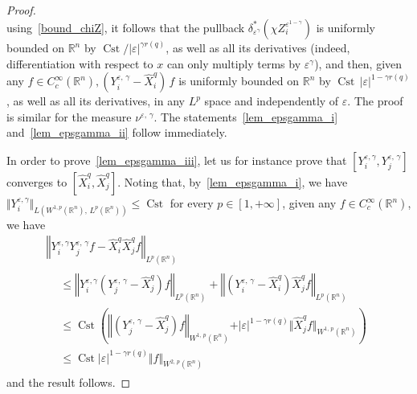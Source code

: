 \documentclass[10pt]{amsart}
\theoremstyle{definition}\newtheorem{defi}[theo]{Definition}\newtheorem{rema}[theo]{Remark}\newtheorem{exam}[theo]{Example}\newtheorem{exem}[theo]{Example}\newtheorem{nota}[theo]{Notation}
\newcommand*\R{\mathbb{R}}
\DeclareMathOperator{\Cst}{Cst}
\renewcommand{\leq}{\leqslant}
\begin{document}
\begin{proof}
\[\]
using~\eqref{bound_chiZ}, it follows that the pullback $\delta_{\varepsilon^\gamma}^* (\chi Z_i^{\varepsilon^{1-\gamma}} )$ is uniformly bounded on $\R^n$ by $\Cst/\vert\varepsilon\vert^{\gamma r(q)}$, as well as all its derivatives (indeed, differentiation with respect to $x$ can only multiply terms by $\varepsilon^\gamma$), and then, given any
$
f\in C_c^\infty(\R^n), (Y_i^{\varepsilon,\,\gamma}-\widehat{X}_i^{q})\,f
$
 is uniformly bounded on $\R^n$ by $\Cst\,\vert\varepsilon\vert^{1-\gamma r(q)}$, as well as all its derivatives, in any $L^p$ space and independently of $\varepsilon$. The proof is similar for the measure $\nu^{\varepsilon,\,\gamma}$. The statements~\eqref{lem_epsgamma_i} and~\eqref{lem_epsgamma_ii} follow immediately.

In order to prove~\eqref{lem_epsgamma_iii}, let us for instance prove that $[Y_i^{\varepsilon,\gamma},Y_j^{\varepsilon,\,\gamma}]$ converges to $[\widehat{X}_i^{q},\widehat{X}_j^{q}]$. Noting that, by~\eqref{lem_epsgamma_i}, we have $\Vert Y_i^{\varepsilon,\gamma}\Vert_{L(W^{1,p}(\R^n),\,L^p(\R^n))}\leq\Cst$ for every $p\in[1,+\infty]$, given any $f\in C_c^\infty(\R^n)$, we have
\begin{multline*}
\left\Vert Y_i^{\varepsilon,\gamma}Y_j^{\varepsilon,\,\gamma}f - \widehat{X}_i^{q}\widehat{X}_j^{q}f\right\Vert_{L^p(\R^n)}\\
\begin{aligned}
&\leq \left\Vert Y_i^{\varepsilon,\gamma} \left(Y_j^{\varepsilon,\,\gamma} - \widehat{X}_j^{q}\right) f\right\Vert_{L^p(\R^n)} + \left\Vert \left(Y_i^{\varepsilon,\,\gamma} - \widehat{X}_i^{q}\right)\widehat{X}_j^{q}f\right\Vert_{L^p(\R^n)}
\\
&\leq \Cst \left(\left\Vert\left(Y_j^{\varepsilon,\,\gamma} - \widehat{X}_j^{q}\right) f\right\Vert_{W^{1,\,p}(\R^n)} + \vert\varepsilon\vert^{1-\gamma r(q)} \Vert\widehat{X}_j^{q}f\Vert_{W^{1,\,p}(\R^n)} \right) \\
&\leq \Cst \vert\varepsilon\vert^{1-\gamma r(q)} \Vert f\Vert_{W^{2,\,p}(\R^n)}
\end{aligned}
\end{multline*}
and the result follows.


\end{proof}
\end{document}
